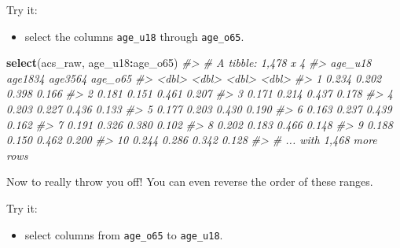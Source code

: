 \documentclass[
]{book}
\newenvironment{Shaded}{\begin{snugshade}}{\end{snugshade}}
\newcommand{\CommentTok}[1]{\textcolor[rgb]{0.56,0.35,0.01}{\textit{#1}}}
\newcommand{\KeywordTok}[1]{\textcolor[rgb]{0.13,0.29,0.53}{\textbf{#1}}}
\newcommand{\NormalTok}[1]{#1}
\newcommand{\OperatorTok}[1]{\textcolor[rgb]{0.81,0.36,0.00}{\textbf{#1}}}
\providecommand{\tightlist}{%
  \setlength{\itemsep}{0pt}\setlength{\parskip}{0pt}}
\begin{document}
Try it:

\begin{itemize}
\tightlist
\item
  select the columns \texttt{age\_u18} through \texttt{age\_o65}.
\end{itemize}

\begin{Shaded}
\begin{Highlighting}[]
\KeywordTok{select}\NormalTok{(acs\_raw, age\_u18}\OperatorTok{:}\NormalTok{age\_o65)}
\CommentTok{\#\textgreater{} \# A tibble: 1,478 x 4}
\CommentTok{\#\textgreater{}    age\_u18 age1834 age3564 age\_o65}
\CommentTok{\#\textgreater{}      \textless{}dbl\textgreater{}   \textless{}dbl\textgreater{}   \textless{}dbl\textgreater{}   \textless{}dbl\textgreater{}}
\CommentTok{\#\textgreater{}  1   0.234   0.202   0.398   0.166}
\CommentTok{\#\textgreater{}  2   0.181   0.151   0.461   0.207}
\CommentTok{\#\textgreater{}  3   0.171   0.214   0.437   0.178}
\CommentTok{\#\textgreater{}  4   0.203   0.227   0.436   0.133}
\CommentTok{\#\textgreater{}  5   0.177   0.203   0.430   0.190}
\CommentTok{\#\textgreater{}  6   0.163   0.237   0.439   0.162}
\CommentTok{\#\textgreater{}  7   0.191   0.326   0.380   0.102}
\CommentTok{\#\textgreater{}  8   0.202   0.183   0.466   0.148}
\CommentTok{\#\textgreater{}  9   0.188   0.150   0.462   0.200}
\CommentTok{\#\textgreater{} 10   0.244   0.286   0.342   0.128}
\CommentTok{\#\textgreater{} \# ... with 1,468 more rows}
\end{Highlighting}
\end{Shaded}

Now to really throw you off! You can even reverse the order of these ranges.

Try it:

\begin{itemize}
\tightlist
\item
  select columns from \texttt{age\_o65} to \texttt{age\_u18}.
\end{itemize}
\end{document}
